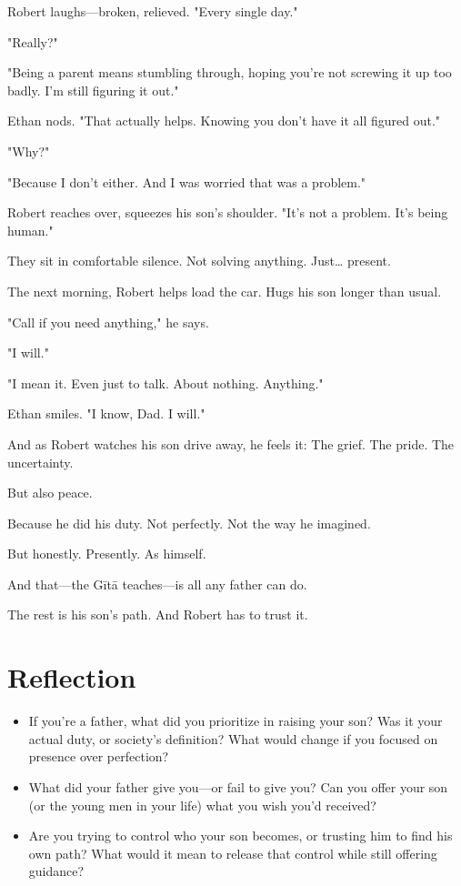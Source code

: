 \documentclass[11pt,twoside]{book}
\begin{document}
Robert laughs—broken, relieved. "Every single day."

"Really?"

"Being a parent means stumbling through, hoping you're not screwing it up too badly. I'm still figuring it out."

Ethan nods. "That actually helps. Knowing you don't have it all figured out."

"Why?"

"Because I don't either. And I was worried that was a problem."

Robert reaches over, squeezes his son's shoulder. "It's not a problem. It's being human."

They sit in comfortable silence. Not solving anything. Just\ldots{} present.

The next morning, Robert helps load the car. Hugs his son longer than usual.

"Call if you need anything," he says.

"I will."

"I mean it. Even just to talk. About nothing. Anything."

Ethan smiles. "I know, Dad. I will."

And as Robert watches his son drive away, he feels it: The grief. The pride. The uncertainty.

But also peace.

Because he did his duty. Not perfectly. Not the way he imagined.

But honestly. Presently. As himself.

And that—the Gītā teaches—is all any father can do.

The rest is his son's path. And Robert has to trust it.

\section*{Reflection}

\begin{itemize}
\item If you're a father, what did you prioritize in raising your son? Was it your actual duty, or society's definition? What would change if you focused on presence over perfection?
\item What did your father give you—or fail to give you? Can you offer your son (or the young men in your life) what you wish you'd received?
\item Are you trying to control who your son becomes, or trusting him to find his own path? What would it mean to release that control while still offering guidance?
\end{itemize}
\end{document}
